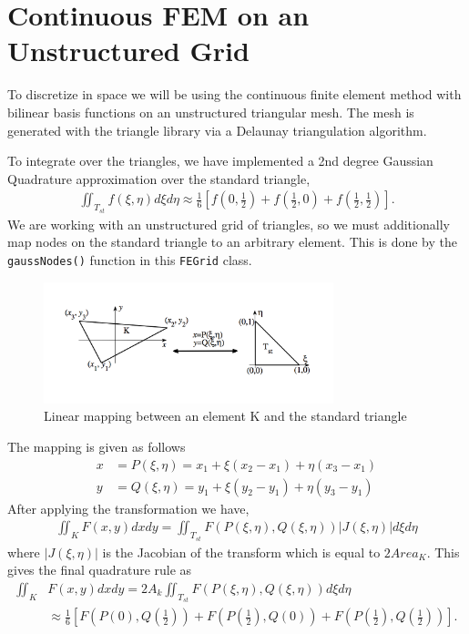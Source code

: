 \section{Continuous FEM on an Unstructured Grid}
To discretize in space we will be using the continuous finite element method with bilinear basis functions on an unstructured triangular mesh. The mesh is generated with the triangle library via a Delaunay triangulation algorithm. 
\par
To integrate over the triangles, we have implemented a 2nd degree Gaussian Quadrature approximation over the standard triangle,
\begin{align}
    \iint_{T_{st}} f(\xi, \eta) d\xi d\eta \approx \frac{1}{6}\left [ f\left( 0, \frac{1}{2} \right ) + f \left( \frac{1}{2}, 0 \right) + f \left( \frac{1}{2}, \frac{1}{2} \right)\right].
\end{align}
We are working with an unstructured grid of triangles, so we must additionally map nodes on the standard triangle to an arbitrary element. This is done by the \texttt{gaussNodes()} function in this \texttt{FEGrid} class. 
\begin{figure}[h]
    \centering
    \includegraphics[width=0.75\textwidth]{fig/TriangleMapping}
    \caption{Linear mapping between an element K and the standard triangle}
    \label{fig:my_label}
\end{figure}
The mapping is given as follows
\begin{align}
    x &= P(\xi, \eta) = x_1 + \xi(x_2 - x_1) + \eta(x_3 - x_1) \\
    y &= Q(\xi, \eta) = y_1 + \xi(y_2 - y_1) + \eta(y_3 - y_1)
\end{align}
After applying the transformation we have,
\begin{align}
 \iint_{K} F(x, y) dx dy = \iint_{T_{st}}F(P(\xi, \eta), Q(\xi, \eta))|J(\xi, \eta)|d\xi d\eta
\end{align}
where $|J(\xi, \eta)|$ is the Jacobian of the transform which is equal to $2Area_K$. This gives the final quadrature rule as
\begin{align}
 \iint_{K} &F(x, y) dx dy = 2A_k\iint_{T_{st}}F(P(\xi, \eta), Q(\xi, \eta))d\xi d\eta \\
 &\approx \frac{1}{6}\left [ F\left( P(0), Q(\frac{1}{2}) \right) + F \left( P(\frac{1}{2}), Q(0) \right) + F \left( P(\frac{1}{2}), Q(\frac{1}{2}) \right)\right].
\end{align}

